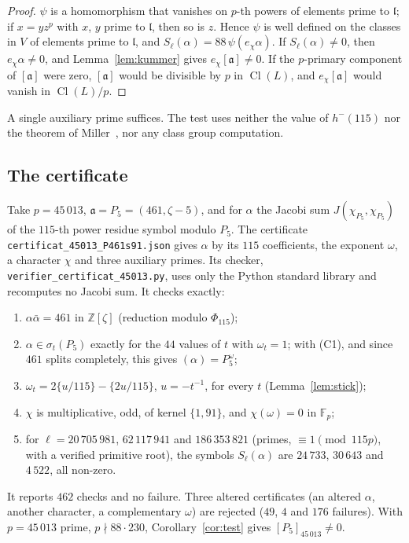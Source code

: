 \documentclass[11pt,a4paper]{amsart}
\theoremstyle{plain}
\theoremstyle{definition}
\newcommand{\Z}{\mathbb{Z}}
\newcommand{\F}{\mathbb{F}}
\newcommand{\aaa}{\mathfrak{a}}
\newcommand{\lpr}{\mathfrak{l}}
\DeclareMathOperator{\Cl}{Cl}
\begin{document}
\begin{proof}
$\psi$ is a homomorphism that vanishes on $p$-th powers of elements prime to $\lpr$; if $x=yz^p$ with $x$, $y$ prime to $\lpr$, then so is $z$. Hence $\psi$ is well defined on the classes in $V$ of elements prime to $\lpr$, and $S_\ell(\alpha)=88\,\psi(e_\chi\alpha)$. If $S_\ell(\alpha)\ne0$, then $e_\chi\alpha\ne0$, and Lemma~\ref{lem:kummer} gives $e_\chi[\aaa]\ne0$. If the $p$-primary component of $[\aaa]$ were zero, $[\aaa]$ would be divisible by $p$ in $\Cl(L)$, and $e_\chi[\aaa]$ would vanish in $\Cl(L)/p$.
\end{proof}

A single auxiliary prime suffices. The test uses neither the value of $h^-(115)$ nor the theorem of Miller~\cite{Mil14}, nor any class group computation.

\subsection{The certificate}\label{subsec:certificat}
Take $p=45\,013$, $\aaa=P_5=(461,\zeta-5)$, and for $\alpha$ the Jacobi sum $J(\chi_{P_5},\chi_{P_5})$ of the $115$-th power residue symbol modulo $P_5$. The certificate \texttt{certificat\_45013\_P461s91.json} gives $\alpha$ by its $115$ coefficients, the exponent $\omega$, a character $\chi$ and three auxiliary primes. Its checker, \texttt{verifier\_certificat\_45013.py}, uses only the Python standard library and recomputes no Jacobi sum. It checks exactly:
\begin{enumerate}[label=\textup{(C\arabic*)}]
\item $\alpha\bar\alpha=461$ in $\Z[\zeta]$ (reduction modulo $\Phi_{115}$);
\item $\alpha\in\sigma_t(P_5)$ exactly for the $44$ values of $t$ with $\omega_t=1$; with (C1), and since $461$ splits completely, this gives $(\alpha)=P_5^\omega$;
\item $\omega_t=2\{u/115\}-\{2u/115\}$, $u=-t^{-1}$, for every $t$ (Lemma~\ref{lem:stick});
\item $\chi$ is multiplicative, odd, of kernel $\{1,91\}$, and $\chi(\omega)=0$ in $\F_p$;
\item for $\ell=20\,705\,981$, $62\,117\,941$ and $186\,353\,821$ (primes, $\equiv1\pmod{115p}$, with a verified primitive root), the symbols $S_\ell(\alpha)$ are $24\,733$, $30\,643$ and $4\,522$, all non-zero.
\end{enumerate}
It reports $462$ checks and no failure. Three altered certificates (an altered $\alpha$, another character, a complementary $\omega$) are rejected ($49$, $4$ and $176$ failures). With $p=45\,013$ prime, $p\nmid88\cdot230$, Corollary~\ref{cor:test} gives $[P_5]_{45\,013}\neq0$.
\end{document}
